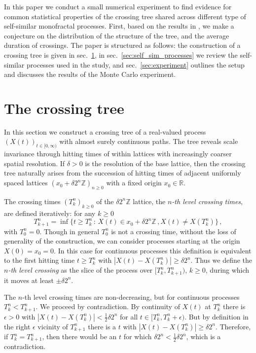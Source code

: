 \documentclass[a4paper]{article}
\newcommand{\Real}{\mathbb{R}}
\begin{document}
In this paper we conduct a small numerical experiment to find evidence for common
statistical properties of the crossing tree shared across different type of self-similar
monofractal processes. First, based on the results in \cite{ECP1673}, we make a
conjecture on the distribution of the structure of the tree, and the average duration
of crossings. The paper is structured as follows: the construction of a crossing tree
is given in sec.~\ref{sec:the_crossing_tree}, in sec.~\ref{sec:self_sim_processes}
we review the self-similar processes used in the study, and sec.~\ref{sec:experiment}
outlines the setup and discusses the results of the Monte Carlo experiment.


\section{The crossing tree} %
\label{sec:the_crossing_tree}

In this section we construct a crossing tree of a real-valued process $(X(t))_{t\in[0, \infty)}$
with almost surely continuous paths. The tree reveals scale invariance through hitting
times of within lattices with increasingly coarser spatial resolution. If $\delta>0$
is the resolution of the base lattice, then the crossing tree naturally arises from
the succession of hitting times of adjacent uniformly spaced lattices $(x_0 + \delta 2^n \mathbb{Z})_{n\geq 0}$
with a fixed origin $x_0\in \Real$.

The crossing times $(T_k^n)_{k\geq0}$ of the $\delta 2^n \mathbb{Z}$ lattice, the
\emph{$n$-th level crossing times}, are defined iteratively: for any $k\geq 0$
\begin{equation} \label{eq:xing_time}
  T_{k+1}^n = \inf\bigl\{t\geq T_k^n\,:\,
        X(t)\in x_0 + \delta 2^n \mathbb{Z}\,, X(t)\neq X(T^n_k)
    \bigr\} \,,
\end{equation}
with $T_0^n = 0$. Though in general $T_0^n$ is not a crossing time, without the
loss of generality of the construction, we can consider processes starting at the
origin $X(0)=x_0=0$. In this case for continuous processes this definition is equivalent
to the first hitting time $t\geq T_k^n$ with $|X(t) - X(T^n_k)| \geq \delta 2^n$.
Thus we define the \emph{$n$-th level crossing} as the slice of the process over
$[T_k^n, T_{k+1}^n)$, $k\geq 0$, during which it moves at least $\pm \delta 2^n$.

The $n$-th level crossing times are non-decreasing, but for continuous processes
$T_k^n < T_{k+1}^n$. We proceed by contradiction. By continuity of $X(t)$ at $T_k^n$
there is $\epsilon>0$ with $|X(t) - X(T_k^n)| < \frac{1}{2}\delta 2^n$ for all
$t\in [T_k^n, T_k^n + \epsilon)$. But by definition in the right $\epsilon$ vicinity
of $T_{k+1}^n$ there is a $t$ with $|X(t) - X(T_k^n)|\geq \delta 2^n$. Therefore,
if $T_k^n = T_{k+1}^n$, then there would be an $t$ for which $\delta 2^n < \frac{1}{2}\delta 2^n$,
which is a contradiction.
\end{document}

